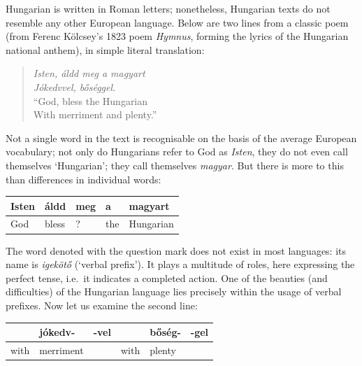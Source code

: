 \begin{multicols}{2}
  Hungarian is written in Roman letters; nonetheless, Hungarian texts do not resemble any other European language. Below are two lines from a classic poem (from Ferenc Kölcsey's 1823 poem \textit{Hymnus}, forming the lyrics of the Hungarian national anthem), in simple literal translation:

  \begin{verse}

  \textit{Isten, áldd meg a magyart}\\
  \textit{Jókedvvel, bőséggel.}\\
  "`God, bless the Hungarian\\
  With merriment and plenty."'
  \end{verse}    

  Not a single word in the text is recognisable on the basis of the average European vocabulary; not only do Hungarians refer to God as \textit{Isten}, they do not even call themselves `Hungarian'; they call themselves \textit{magyar}. But there is more to this than differences in individual words:

  \vspace{3mm}

  \begin{tabular}{l|l|l|l|l}
      Isten & áldd & meg & a & magyart\\
      \hline
      God & bless & ? & the & Hungarian\\
    \end{tabular}

  \vspace{3mm} 

  The word denoted with the question mark does not exist in most languages: its name is \textit{igekötő} (`verbal prefix'). It plays a multitude of roles, here expressing the perfect tense, i.e.~it indicates a completed action. One of the beauties (and difficulties) of the Hungarian language lies precisely within the usage of verbal prefixes. Now let us examine the second line:

   \vspace{3mm}

  \begin{tabular}{l|l|l|l|l|l}
      & jókedv- & -vel & & bőség- & -gel\\
      \hline
      with & merriment & & with & plenty & \\
    \end{tabular}

  \vspace{3mm}  


\end{multicols}
